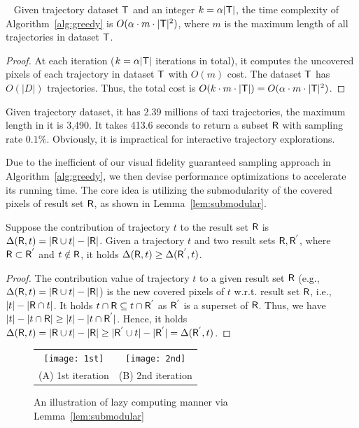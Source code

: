 \begin{lemma}~\label{lem:cost}
Given trajectory dataset $\mathsf{T}$ and an integer $k = \alpha |\mathsf{T}|$, the time complexity of Algorithm~\ref{alg:greedy} is $O(\alpha \cdot m \cdot |\mathsf{T}|^2)$, where $m$ is the maximum length of all trajectories in dataset $\mathsf{T}$.
\end{lemma}

\begin{proof}
At each iteration ($k = \alpha |\mathsf{T}|$ iterations in total),
it computes the uncovered pixels of each trajectory in dataset $\mathsf{T}$ with $O(m)$ cost.
The dataset $\mathsf{T}$ has $O(|D|)$ trajectories.
Thus, the total cost is $O(k \cdot m \cdot |\mathsf{T}|)=O(\alpha \cdot m \cdot |\mathsf{T}|^2)$.
\end{proof}

 Given \pt{} trajectory dataset, it has 2.39 millions of taxi trajectories, the maximum length in it is 3,490.
It takes 413.6 seconds to return a subset $\mathsf{R}$ with sampling rate $0.1\%$.
Obviously, it is impractical for interactive trajectory explorations.

Due to the inefficient of our visual fidelity guaranteed sampling approach in Algorithm~\ref{alg:greedy},
we then devise performance optimizations to accelerate its running time.
The core idea is utilizing the submodularity of the covered pixels of result set $\mathsf{R}$, as shown in Lemma~\ref{lem:submodular}.

\begin{lemma}[Submodularity]\label{lem:submodular}
Suppose the contribution of trajectory $t$ to the result set $\mathsf{R}$ is $\Delta(\mathsf{R}, t) = |\mathsf{R} \cup t| - |\mathsf{R}|$.
Given a trajectory $t$ and two result sets $\mathsf{R},\mathsf{R}^{'}$, where $\mathsf{R} \subset \mathsf{R}^{'}$ and $t \notin \mathsf{R}$,
it holds $ \Delta(\mathsf{R}, t) \geq \Delta(\mathsf{R}^{'}, t)$.
\end{lemma}

\begin{proof}
The contribution value of trajectory $t$ to a given result set $\mathsf{R}$ (e.g., $\Delta(\mathsf{R}, t) = |\mathsf{R} \cup t| - |\mathsf{R}|$) is the new covered pixels of $t$ w.r.t. result set $\mathsf{R}$, i.e., $|t| - |\mathsf{R} \cap t|$.
It holds $t \cap \mathsf{R} \subseteq  t \cap \mathsf{R}^{'}$ as $\mathsf{R}^{'}$ is a superset of $\mathsf{R}$.
Thus, we have $|t| - |t \cap \mathsf{R}| \geq |t| - |t \cap \mathsf{R}^{'}|$.
Hence, it holds $\Delta(\mathsf{R}, t) = |\mathsf{R} \cup t| - |\mathsf{R}| \geq |\mathsf{R}^{'} \cup t| - |\mathsf{R}^{'}|= \Delta(\mathsf{R}^{'}, t)$.
\end{proof}

\begin{figure}
 \centering
 \small
 \begin{tabular}{cc}
   \texttt{[image: 1st]}
   &
   \texttt{[image: 2nd]}
   \\
   (A) 1st iteration
   &
   (B) 2nd iteration
 \end{tabular}
 \vspace{-3mm}
 \caption{An illustration of lazy computing manner via Lemma~\ref{lem:submodular}} \label{fig:heap}
 \vspace{-6mm}
\end{figure}


